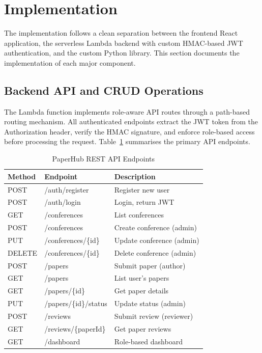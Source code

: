 \documentclass[conference]{IEEEtran}
\begin{document}
\section{Implementation}

The implementation follows a clean separation between the frontend React application, the serverless Lambda backend with custom HMAC-based JWT authentication, and the custom Python library. This section documents the implementation of each major component.

\subsection{Backend API and CRUD Operations}

The Lambda function implements role-aware API routes through a path-based routing mechanism. All authenticated endpoints extract the JWT token from the Authorization header, verify the HMAC signature, and enforce role-based access before processing the request. Table~\ref{tab:endpoints} summarises the primary API endpoints.

\begin{table}[H]
\centering
\caption{PaperHub REST API Endpoints}
\label{tab:endpoints}
\begin{tabular}{|l|l|l|}
\hline
\textbf{Method} & \textbf{Endpoint} & \textbf{Description} \\
\hline
POST & /auth/register & Register new user \\
POST & /auth/login & Login, return JWT \\
\hline
GET & /conferences & List conferences \\
POST & /conferences & Create conference (admin) \\
PUT & /conferences/\{id\} & Update conference (admin) \\
DELETE & /conferences/\{id\} & Delete conference (admin) \\
\hline
POST & /papers & Submit paper (author) \\
GET & /papers & List user's papers \\
GET & /papers/\{id\} & Get paper details \\
PUT & /papers/\{id\}/status & Update status (admin) \\
\hline
POST & /reviews & Submit review (reviewer) \\
GET & /reviews/\{paperId\} & Get paper reviews \\
\hline
GET & /dashboard & Role-based dashboard \\
\hline
\end{tabular}
\end{table}
\end{document}
